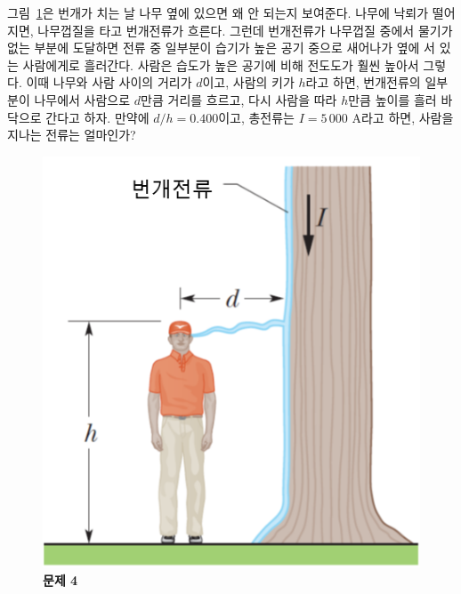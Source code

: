 \documentclass[tightenlines,floatfix,nofootinbib,superscriptaddress,fleqn]{revtex4-2}
\begin{document}
그림~\ref{fig:1}은 번개가 치는 날 나무 옆에 있으면 왜 안 되는지
보여준다. 나무에 낙뢰가 떨어지면, 나무껍질을 타고 번개전류가 흐른다.
그런데 번개전류가 나무껍질 중에서 물기가 없는 부분에 도달하면 전류 중
일부분이 습기가 높은 공기 중으로 새어나가 옆에 서 있는 사람에게로
흘러간다. 사람은 습도가 높은 공기에 비해 전도도가 훨씬 높아서
그렇다. 이때 나무와 사람 사이의 거리가 $d$이고, 사람의 키가 $h$라고
하면, 번개전류의 일부분이 나무에서 사람으로 $d$만큼 거리를 흐르고,
다시 사람을 따라 $h$만큼 높이를 흘러 바닥으로 간다고 하자. 만약에
$d/h=0.400$이고, 총전류는 $I=5\,000$ A라고 하면, 사람을 지나는 전류는
얼마인가? 

\begin{figure}[htp]
  \centering
  \includegraphics[scale=0.45]{qfig5-20220914-1.png}
  \caption{\textbf{문제 4}}
  \label{fig:1}
\end{figure}

\vspace{1.cm}
\end{document}
